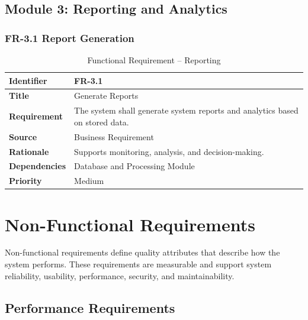 \subsection{Module 3: Reporting and Analytics}

\subsubsection{FR-3.1 Report Generation}

\begin{table}[h]
\centering
\caption{Functional Requirement – Reporting}

\begin{tabularx}{\textwidth}{|p{3cm}|X|}
\hline
\textbf{Identifier} & FR-3.1 \\
\hline
\textbf{Title} & Generate Reports \\
\hline
\textbf{Requirement} & The system shall generate system reports and analytics based on stored data. \\
\hline
\textbf{Source} & Business Requirement \\
\hline
\textbf{Rationale} & Supports monitoring, analysis, and decision-making. \\
\hline
\textbf{Dependencies} & Database and Processing Module \\
\hline
\textbf{Priority} & Medium \\
\hline
\end{tabularx}

\end{table}



\section{Non-Functional Requirements}

Non-functional requirements define quality attributes that describe how the system performs. 
These requirements are measurable and support system reliability, usability, performance, 
security, and maintainability.

\subsection{Performance Requirements}

